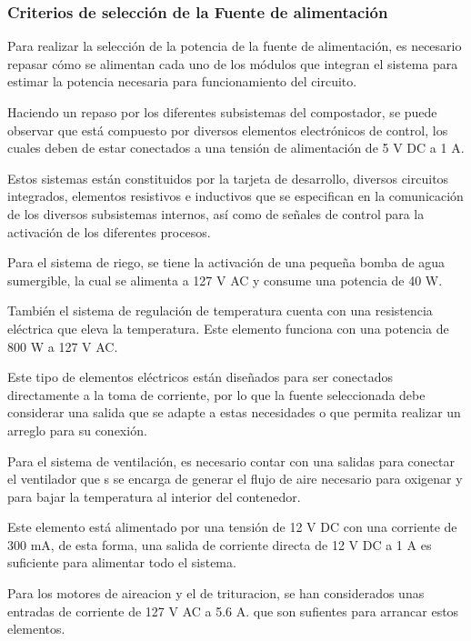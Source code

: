 \subsubsection{Criterios de selección de la Fuente de alimentación}

Para realizar la selección de la potencia de la fuente de alimentación, es necesario repasar cómo se alimentan cada uno de los módulos que integran el sistema para estimar la potencia necesaria para funcionamiento del circuito.

Haciendo un repaso por los diferentes subsistemas del compostador, se puede observar que está compuesto por diversos elementos electrónicos de control, los cuales deben de estar conectados a una tensión de alimentación de 5 V DC a 1 A.

Estos sistemas están constituidos por la tarjeta de desarrollo, diversos circuitos integrados, elementos resistivos e inductivos que se especifican en la comunicación de los diversos subsistemas internos, así como de señales de control para la activación de los diferentes procesos.

Para el sistema de riego, se tiene la activación de una pequeña bomba de agua sumergible, la cual se alimenta a 127 V AC y consume una potencia de 40 W.

También  el sistema de regulación de temperatura cuenta con una resistencia eléctrica que eleva la temperatura. Este elemento funciona con una potencia de 800 W a 127 V AC. 

Este tipo de elementos eléctricos están diseñados para ser conectados directamente a la toma de corriente, por lo que la fuente seleccionada debe considerar una salida que se adapte a estas necesidades o que permita realizar un arreglo para su conexión.

Para el sistema de ventilación, es necesario contar con una salidas para conectar el ventilador que s se encarga de generar el flujo de aire necesario para oxigenar y para bajar la temperatura al interior del contenedor. 

Este elemento está alimentado por una tensión de 12 V DC con una corriente de 300 mA, de esta forma, una salida de corriente directa de 12 V DC a 1 A es suficiente para alimentar todo el sistema.
 
Para los motores de aireacion y el de trituracion, se han considerados unas entradas de corriente de 127 V AC a 5.6 A. que son sufientes para arrancar estos elementos.
